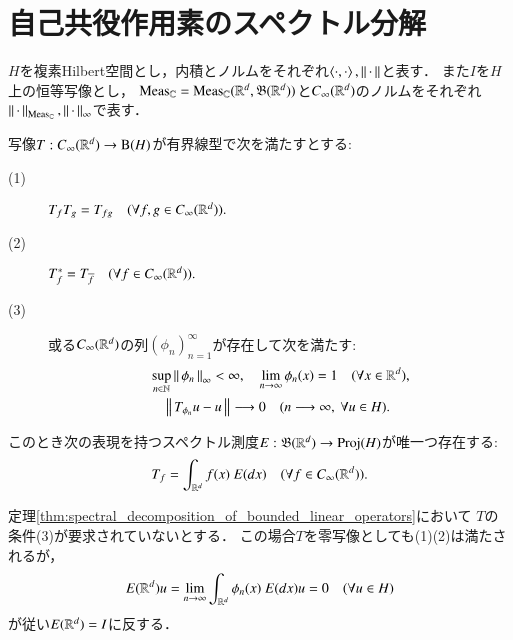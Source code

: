 \section{自己共役作用素のスペクトル分解}
	$H$を複素Hilbert空間とし，内積とノルムをそれぞれ$\inprod<\cdot,\cdot>,\Norm{\cdot}{}$と表す．
	また$I$を$H$上の恒等写像とし，
	$\mathrm{Meas}_{\mathbb{C}} = \mathrm{Meas}_{\mathbb{C}}(\mathbb{R}^d,\mathfrak{B}(\mathbb{R}^d))$と$C_\infty (\mathbb{R}^d)$のノルムをそれぞれ$\left\|\, \cdot\, \right\|_{\mathrm{Meas}_{\mathbb{C}}},\left\|\, \cdot\, \right\|_{\infty}$で表す．
	
	\begin{screen}
		\begin{thm}[スペクトル分解定理]
			写像$T:C_\infty (\mathbb{R}^d) \rightarrow \mathrm{B}(H) $が有界線型で次を満たすとする:
			\begin{description}
				\item[(1)] $T_f T_g = T_{fg} \quad (\forall f,g \in C_\infty (\mathbb{R}^d)).$
				\item[(2)] $T_f^* = T_{\overline{f}} \quad (\forall f \in C_\infty (\mathbb{R}^d)).$
				\item[(3)] 或る$C_\infty (\mathbb{R}^d)$の列$(\phi_n)_{n=1}^{\infty}$が存在して次を満たす:
					\begin{align}
						&\operatorname*{sup}_{n \in \mathbb{N}} \left\|\, \phi_n\, \right\|_{\infty} < \infty,
						\quad \lim_{n \to \infty} \phi_n(x) = 1 \quad (\forall x \in \mathbb{R}^d), \\
						&\quad \left\|\, T_{\phi_n}u - u\, \right\|_{} \longrightarrow 0
							\quad (n \longrightarrow \infty,\ \forall u \in H).
					\end{align}
			\end{description}
			このとき次の表現を持つスペクトル測度$E:\mathfrak{B}(\mathbb{R}^d) \rightarrow \mathrm{Proj}( H )$が唯一つ存在する:
			\begin{align}
				T_f = \int_{\mathbb{R}^d} f(x)\ E(dx) \quad (\forall f \in C_\infty (\mathbb{R}^d)).
				\label{eq:thm_pectral_decomposition_of_bounded_linear_operators_0}
			\end{align}
			\label{thm:spectral_decomposition_of_bounded_linear_operators}
		\end{thm}
	\end{screen}
	
	定理\ref{thm:spectral_decomposition_of_bounded_linear_operators}において
	$T$の条件(3)が要求されていないとする．
	この場合$T$を零写像としても(1)(2)は満たされるが，
	\begin{align}
		E(\mathbb{R}^d)u = \lim_{n \to \infty} \int_{\mathbb{R}^d} \phi_n(x)\ E(dx) u = 0 \quad (\forall u \in H)
	\end{align}
	が従い$E(\mathbb{R}^d) = I$に反する．
	
